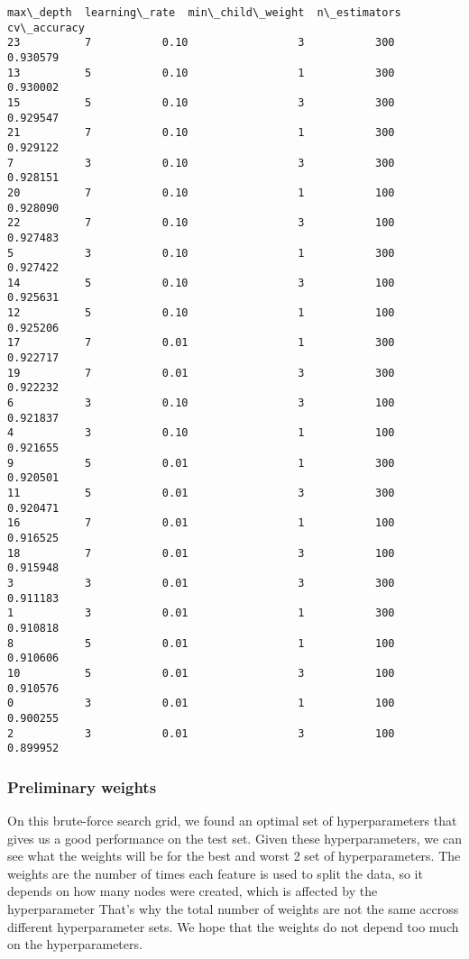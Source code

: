 \documentclass[11pt]{article}
\makeatletter
\newcommand{\boxspacing}{\kern\kvtcb@left@rule\kern\kvtcb@boxsep}
\newcommand{\prompt}[4]{
        {\ttfamily\llap{{\color{#2}[#3]:\hspace{3pt}#4}}\vspace{-\baselineskip}}
    }
\makeatother
\begin{document}
            \begin{tcolorbox}[breakable, size=fbox, boxrule=.5pt, pad at break*=1mm, opacityfill=0]
\prompt{Out}{outcolor}{41}{\boxspacing}
\begin{Verbatim}[commandchars=\\\{\}]
    max\_depth  learning\_rate  min\_child\_weight  n\_estimators  cv\_accuracy
23          7           0.10                 3           300     0.930579
13          5           0.10                 1           300     0.930002
15          5           0.10                 3           300     0.929547
21          7           0.10                 1           300     0.929122
7           3           0.10                 3           300     0.928151
20          7           0.10                 1           100     0.928090
22          7           0.10                 3           100     0.927483
5           3           0.10                 1           300     0.927422
14          5           0.10                 3           100     0.925631
12          5           0.10                 1           100     0.925206
17          7           0.01                 1           300     0.922717
19          7           0.01                 3           300     0.922232
6           3           0.10                 3           100     0.921837
4           3           0.10                 1           100     0.921655
9           5           0.01                 1           300     0.920501
11          5           0.01                 3           300     0.920471
16          7           0.01                 1           100     0.916525
18          7           0.01                 3           100     0.915948
3           3           0.01                 3           300     0.911183
1           3           0.01                 1           300     0.910818
8           5           0.01                 1           100     0.910606
10          5           0.01                 3           100     0.910576
0           3           0.01                 1           100     0.900255
2           3           0.01                 3           100     0.899952
\end{Verbatim}
\end{tcolorbox}
        
    \subsubsection{Preliminary weights}\label{preliminary-weights}

On this brute-force search grid, we found an optimal set of
hyperparameters that gives us a good performance on the test set. Given
these hyperparameters, we can see what the weights will be for the best
and worst 2 set of hyperparameters. The weights are the number of times
each feature is used to split the data, so it depends on how many nodes
were created, which is affected by the hyperparameter That's why the
total number of weights are not the same accross different
hyperparameter sets. We hope that the weights do not depend too much on
the hyperparameters.
\end{document}
